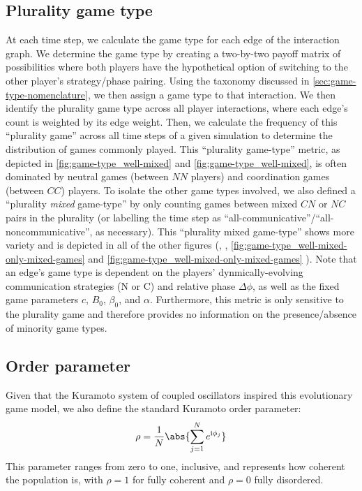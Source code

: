 \documentclass[pdflatex,twocolumn,sn-nature,super]{sn-jnl}
\begin{document}
\subsection{Plurality game type}\label{sec:plurality_game_type}
At each time step, we calculate the game type for each edge
of the interaction graph.
We determine the game type by creating a two-by-two payoff matrix of possibilities
where both players have the hypothetical option of switching to the other player's
strategy/phase pairing.
Using the taxonomy discussed in \cref{sec:game-type-nomenclature},
we then assign a game type to that interaction.
We then identify the plurality game type across all player interactions,
where each edge's count is weighted by its edge weight.
Then, we calculate the frequency of this ``plurality game'' across
all time steps of a given simulation to determine the distribution
of games commonly played.
This ``plurality game-type'' metric, as depicted in
\cref{fig:game-type_well-mixed} and \cref{fig:game-type_well-mixed},
is often dominated by neutral games (between $NN$ players)
and coordination games (between $CC$) players.
To isolate the other game types involved,
we also defined a ``plurality \emph{mixed} game-type''
by only counting games between mixed $CN$ or $NC$ pairs in the plurality
(or labelling the time step as ``all-communicative''/``all-noncommunicative'',
as necessary).
This ``plurality mixed game-type'' shows more variety
and is depicted in all of the other figures
(, ,
\cref{fig:game-type_well-mixed-only-mixed-games}
and \cref{fig:game-type_well-mixed-only-mixed-games}
).
Note that an edge's game type is dependent
on the players' dynmically-evolving communication strategies (N or C)
and relative phase $\Delta \phi$,
as well as the fixed game parameters $c$, $B_0$, $\beta_0$, and $\alpha$.
Furthermore, this metric is only sensitive to the
plurality game and therefore provides no information
on the presence/absence of minority game types.

\subsection{Order parameter}
Given that the Kuramoto system of coupled oscillators
inspired this evolutionary game model,
we also define the standard Kuramoto order parameter:
\begin{equation}
  \rho = \frac{1}{N} \abs{\sum_{j=1}^N e^{\im \phi_j}}
  \label{eq:order_parameter}
\end{equation}
This parameter ranges from zero to one, inclusive,
and represents how coherent the population is,
with $\rho = 1$ for fully coherent and $\rho = 0$ fully disordered.
\end{document}
